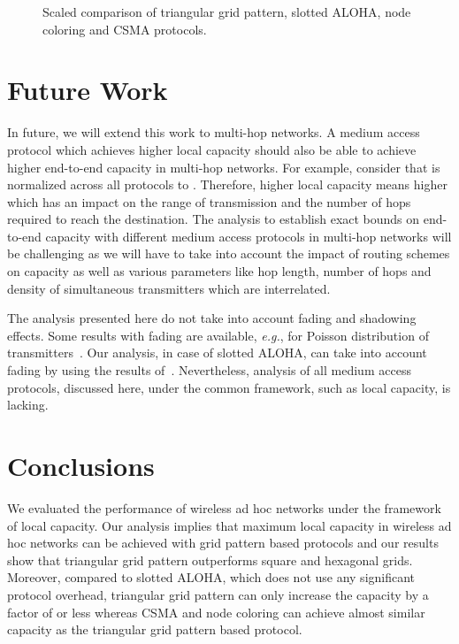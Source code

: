 \documentclass[12pt,english]{article}
\begin{document}
\begin{figure*}[!t]
\centering
{}
\caption{Scaled comparison of triangular grid pattern, slotted ALOHA, node coloring and CSMA protocols. 
\label{fig:improvement}}
\end{figure*}

\section{Future Work}
\label{sec:future}

In future, we will extend this work to multi-hop networks. A medium access protocol which achieves higher local capacity should also be able to achieve higher end-to-end capacity in multi-hop networks. For example, consider that  is normalized across all protocols to . Therefore, higher local capacity means higher  which has an impact on the range of transmission and the number of hops required to reach the destination. The analysis to establish exact bounds on end-to-end capacity with different medium access protocols in multi-hop networks will be challenging as we will have to take into account the impact of routing schemes on capacity as well as various parameters like hop length, number of hops and density of simultaneous transmitters which are interrelated. 

The analysis presented here do not take into account fading and shadowing effects. Some results with fading are available, {\it e.g.}, for Poisson distribution of transmitters~\cite{Weber2,Bartek,Haenggi}. Our analysis, in case of slotted ALOHA, can take into account fading by using the results of~\cite{Jacquet:2009}. Nevertheless, analysis of all medium access protocols, discussed here, under the common framework, such as local capacity, is lacking. 

\section{Conclusions}
\label{sec:conclude}

We evaluated the performance of wireless ad hoc networks under the framework of local capacity. Our analysis implies that maximum local capacity in wireless ad hoc networks can be achieved with grid pattern based protocols and our results show that triangular grid pattern outperforms square and hexagonal grids. Moreover, compared to slotted ALOHA, which does not use any significant protocol overhead, triangular grid pattern can only increase the capacity by a factor of  or less whereas CSMA and node coloring can achieve almost similar capacity as the triangular grid pattern based protocol.  
\end{document}
